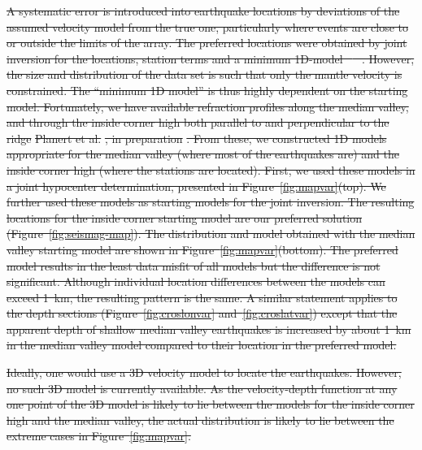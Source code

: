 \documentclass[jgrga]{agu2001} %
\newlength{\tw}
\providecommand{\DIFdel}[1]{{\protect\color{red}\sout{#1}}}                      %
\begin{document}
\begin{article}
\DIFdel{A systematic error is introduced into earthquake locations by
deviations of the assumed velocity model from the true one, particularly where
events are close to or outside the limits of the array.  The preferred
locations were obtained by joint inversion for the locations,
station terms and a minimum 1D-model \mbox{%
\citep[using
VELEST,][]{kissling94}
}%
. However, the size and distribution of the data
set is such that only the mantle velocity is constrained.
The ``minimum 1D model'' is thus highly dependent on the starting
model.  Fortunately, we have available refraction profiles along the median
valley, and through the inside corner high both parallel to and
perpendicular to the ridge }%
\DIFdel{Planert et al.}%
\DIFdel{,
in preparation}%
\DIFdel{.  From these, we constructed 1D models appropriate for
the median valley (where most of the earthquakes are) and the inside
corner high (where the stations are located).  First, we used these
models in a joint hypocenter determination, presented in Figure~\ref{fig:mapvar}(top).
We further used these
models as starting models for the joint inversion. The resulting
locations for the inside corner starting model are our preferred
solution (Figure~\ref{fig:seismag-map}). The distribution and model obtained with the median valley
starting model are shown in Figure~\ref{fig:mapvar}(bottom).  The
preferred model results in the least data misfit of all models but the
difference is not significant.  Although individual location
differences between the models can exceed 1~km, the resulting pattern
is the same.  A similar statement applies to the depth sections
(Figure~\ref{fig:croslonvar} and~\ref{fig:croslatvar}) except that the
apparent depth of shallow median valley earthquakes is 
increased by about 1~km in the median valley model compared to their
location in the preferred model.
}%

\DIFdel{Ideally, one would use a 3D velocity model to locate the earthquakes.
However, no such 3D model is currently available.
As the velocity-depth function at
any one point of the 3D model is likely to lie between the models for
the inside corner high and the median valley, the actual distribution
is likely to lie between the extreme cases in Figure~\ref{fig:mapvar}.
}%


\end{article}
\end{document}
